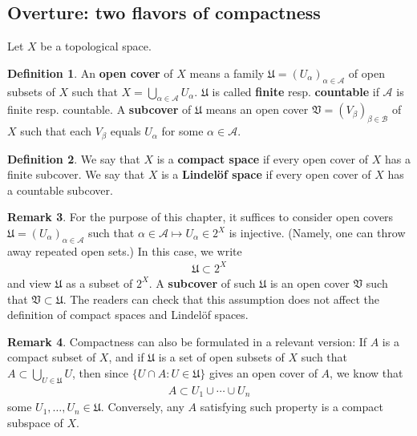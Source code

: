 \documentclass[12pt,b5paper,notitlepage]{article}
\theoremstyle{definition}
\newtheorem{df}{Definition}[section]
\newtheorem{rem}[df]{Remark}
\theoremstyle{plain}
\newcommand{\fk}{\mathfrak}
\newcommand{\scr}{\mathscr}
\numberwithin{equation}{section}
\begin{document}
\subsection{Overture: two flavors of compactness}

Let $X$ be a topological space.



\begin{df}
An \textbf{open cover}  of $X$ means a family $\fk U=(U_\alpha)_{\alpha\in\scr A}$ of open subsets of $X$ such that $X=\bigcup_{\alpha\in\scr A} U_\alpha$. $\fk U$ is called \textbf{finite} resp. \textbf{countable} if $\scr A$ is finite resp. countable. A \textbf{subcover}  of $\fk U$ means an open cover $\fk V=(V_\beta)_{\beta\in\scr B}$ of $X$ such that each $V_\beta$ equals $U_\alpha$ for some $\alpha\in\scr A$.
\end{df}

\begin{df}
We say that $X$ is a \textbf{compact space}  if every open cover of $X$ has a finite subcover.  We say that $X$ is a \textbf{Lindel\"of space}  if every open cover of $X$ has a countable subcover.
\end{df}

\begin{rem}
For the purpose of this chapter, it suffices to consider open covers $\fk U=(U_\alpha)_{\alpha\in\scr A}$ such that $\alpha\in\scr A\mapsto U_\alpha\in 2^X$ is injective. (Namely, one can throw away repeated open sets.) In this case, we write
\begin{align*}
\fk U\subset 2^X
\end{align*}
and view $\fk U$ as a subset of $2^X$. A \textbf{subcover} of such $\fk U$ is an open cover $\fk V$ such that $\fk V\subset\fk U$. The readers can check that this assumption does not affect the definition of compact spaces and Lindel\"of spaces.
\end{rem}

\begin{rem}\label{lb244}
Compactness can also be formulated in a relevant version: If $A$ is a compact subset of $X$, and if $\fk U$ is a set of open subsets of $X$ such that $A\subset\bigcup_{U\in\fk U}U$, then since $\{U\cap A:U\in\fk U\}$ gives an open cover of $A$, we know that
\begin{align*}
A\subset U_1\cup\cdots\cup U_n
\end{align*}
some $U_1,\dots,U_n\in\fk U$. Conversely, any $A$ satisfying such property is a compact subspace of $X$.
\end{rem}
\end{document}
